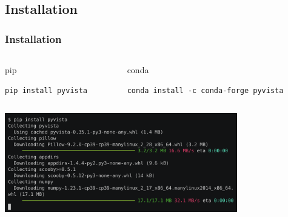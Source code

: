 \documentclass[t]{beamer}
\begin{document}
\subsection{Installation}
\begin{frame}[fragile=singleslide]
  \frametitle{Installation}
  \vspace{-10pt}

  \begin{columns}[T]
    \begin{column}{.5\textwidth}
      \vspace{-10pt}
      \begin{exampleblock}{pip}
        \begin{lstlisting}[basicstyle=\ttfamily\footnotesize]
pip install pyvista
        \end{lstlisting}
      \end{exampleblock}

    \end{column}

    \begin{column}{.5\textwidth}
      \vspace{-10pt}
      \begin{exampleblock}{conda}
        \begin{lstlisting}[basicstyle=\ttfamily\footnotesize]
conda install -c conda-forge pyvista
        \end{lstlisting}
      \end{exampleblock}

    \end{column}
  \end{columns}

  \vspace{5pt}

  \centering
  \href{https://asciinema.org/a/507562}{\includegraphics[width=0.76\textwidth]{figures/install_pyvista.png}}

\end{frame}


\end{document}
